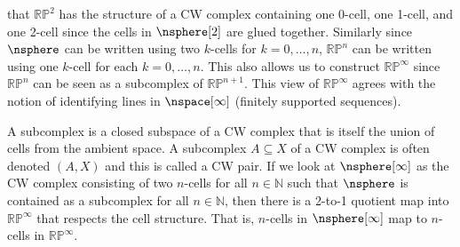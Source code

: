         that $\mathbb{RP}^{2}$ has the structure of a CW complex
        containing one 0-cell, one 1-cell, and one 2-cell since the
        cells in $\nsphere[2]$ are glued together. Similarly since
        $\nsphere$ can be written using two $k$-cells for $k=0,\dots,n$,
        $\mathbb{RP}^{n}$ can be written using one $k$-cell for each
        $k=0,\dots,n$. This also allows us to construct
        $\mathbb{RP}^{\infty}$ since $\mathbb{RP}^{n}$ can be seen as a
        subcomplex of $\mathbb{RP}^{n+1}$. This view of
        $\mathbb{RP}^{\infty}$ agrees with the notion of identifying
        lines in $\nspace[\infty]$ (finitely supported sequences).
        \par\hfill\par
        A subcomplex is a closed subspace of a CW complex that is itself
        the union of cells from the ambient space. A subcomplex
        $A\subseteq{X}$ of a CW complex is often denoted $(A,X)$ and
        this is called a CW pair. If we look at $\nsphere[\infty]$ as
        the CW complex consisting of two $n$-cells for all
        $n\in\mathbb{N}$ such that $\nsphere$ is contained as a
        subcomplex for all $n\in\mathbb{N}$, then there is a 2-to-1
        quotient map into $\mathbb{RP}^{\infty}$ that respects the cell
        structure. That is, $n$-cells in $\nsphere[\infty]$ map to
        $n$-cells in $\mathbb{RP}^{\infty}$.

